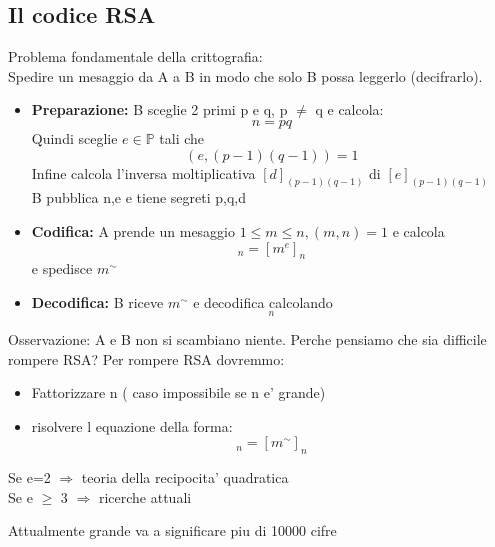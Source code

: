\documentclass{article}
\begin{document}
     \subsection{Il codice RSA}
     \begin{flushleft}
      Problema fondamentale della crittografia: \\ 
       Spedire un mesaggio da  A a B in modo che solo B possa leggerlo (decifrarlo).
     \end{flushleft}
     \begin{itemize}
       \item \textbf{Preparazione:} B sceglie 2 primi p e q, p $\neq$ q e calcola:
         \begin{equation}
          n=pq
         \end{equation}
         Quindi sceglie $e \in \mathbb{P}$ tali che 
         \begin{equation}
           (e,(p-1)(q-1))=1
         \end{equation}
         Infine calcola l'inversa moltiplicativa $[d]_{(p-1)(q-1)}$ di $[e]_{(p-1)(q-1)}$\\ 
         B pubblica n,e  e tiene segreti p,q,d
       \item \textbf{Codifica:} A prende un mesaggio $1 \leq m \leq n,(m,n)=1$ e calcola
         \begin{equation}
           [m^{\sim}]_n=[m^e]_n
         \end{equation}
         e spedisce $m^{\sim}$
       \item \textbf{Decodifica:} B riceve $m^{\sim}$ e decodifica calcolando
         \begin{equation}
           [m^{\sim d}]_n
         \end{equation}
     \end{itemize}
     \begin{flushleft}
       Osservazione: A e B non si scambiano niente. Perche pensiamo che sia difficile rompere RSA? Per rompere RSA dovremmo:
     \end{flushleft}
     \begin{itemize}
       \item Fattorizzare n ( caso impossibile se n e' grande)
       \item risolvere l equazione della forma:
         \begin{equation}
           [x^e]_n=[m^{\sim}]_n
         \end{equation}
     \end{itemize}
     \begin{flushleft}
      Se e=2 $\Rightarrow$ teoria della recipocita' quadratica \\ 
       Se e $\geq$ 3 $\Rightarrow$ ricerche attuali
     \end{flushleft}
     \begin{flushleft}
      Attualmente grande va a significare piu di 10000 cifre
     \end{flushleft}
\end{document}
